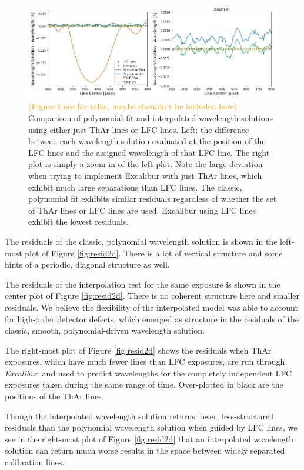 \documentclass[12pt, onecolumn]{aastex63}
\newcommand{\lz}[1]{\textcolor{orange}{#1}}
\newcommand{\project}[1]{\textsl{#1}}
\newcommand{\name}{\project{Excalibur}}
\begin{document}
\begin{figure}[t]
\centering
\includegraphics[width=\textwidth]{Figures/lineDensity.png}
\caption{\lz{(Figure I use for talks, maybe shouldn't be included here)}  Comparison of polynomial-fit and interpolated wavelength solutions using either just ThAr lines or LFC lines. Left: the difference between each wavelength solution evaluated at the position of the LFC lines and the assigned wavelength of that LFC line.  The right plot is simply a zoom in of the left plot.  Note the large deviation when trying to implement Excalibur with just ThAr lines, which exhibit much large separations than LFC lines.  The classic, polynomial  fit exhibits similar residuals regardless of whether the set of ThAr lines or LFC lines are used.  Excalibur using LFC lines exhibit the lowest residuals.}
\label{fig:waveResids}
\end{figure} 

The residuals of the classic, polynomial wavelength solution is shown in the left-most plot of Figure \ref{fig:resid2d}.  There is a lot of vertical structure and some hints of a periodic, diagonal structure as well.

The residuals of the interpolation test for the same exposure is shown in the center plot of Figure \ref{fig:resid2d}.  There is no coherent structure here and smaller residuals.  We believe the flexibility of the interpolated model was able to account for high-order detector defects, which emerged as structure in the residuals of the classic, smooth, polynomial-driven wavelength solution.

The right-most plot of Figure \ref{fig:resid2d} shows the residuals when ThAr exposures, which have much fewer lines than LFC exposures, are run through \name\ and used to predict wavelengths for the completely independent LFC exposures taken during the same range of time.  Over-plotted in black are the positions of the ThAr lines.

Though the interpolated wavelength solution returns lower, less-structured residuals than the polynomial wavelength solution when guided by LFC lines, we see in the right-most plot of Figure \ref{fig:resid2d} that an interpolated wavelength solution can return much worse results in the space between widely separated calibration lines.
\end{document}
